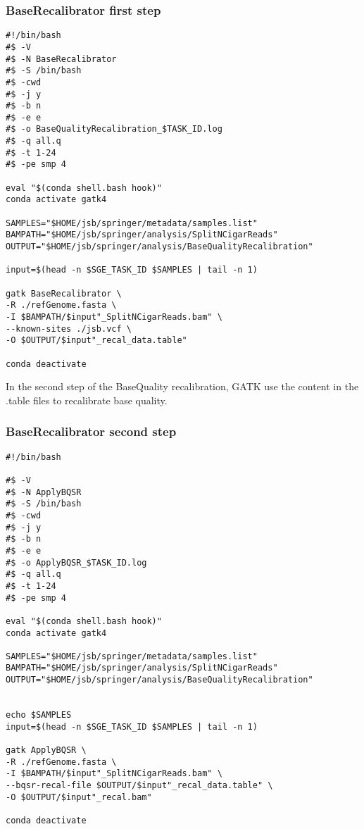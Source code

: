 \subsubsection{BaseRecalibrator first step}
\begin{verbatim}
#!/bin/bash
#$ -V
#$ -N BaseRecalibrator
#$ -S /bin/bash
#$ -cwd
#$ -j y
#$ -b n
#$ -e e
#$ -o BaseQualityRecalibration_$TASK_ID.log
#$ -q all.q
#$ -t 1-24
#$ -pe smp 4

eval "$(conda shell.bash hook)"
conda activate gatk4

SAMPLES="$HOME/jsb/springer/metadata/samples.list"
BAMPATH="$HOME/jsb/springer/analysis/SplitNCigarReads"
OUTPUT="$HOME/jsb/springer/analysis/BaseQualityRecalibration"

input=$(head -n $SGE_TASK_ID $SAMPLES | tail -n 1)

gatk BaseRecalibrator \
-R ./refGenome.fasta \
-I $BAMPATH/$input"_SplitNCigarReads.bam" \
--known-sites ./jsb.vcf \
-O $OUTPUT/$input"_recal_data.table"

conda deactivate
\end{verbatim}


In the second step of the BaseQuality recalibration, GATK use the content in the .table files to recalibrate base quality.


\subsubsection{BaseRecalibrator second step}
\begin{verbatim}
#!/bin/bash

#$ -V
#$ -N ApplyBQSR
#$ -S /bin/bash
#$ -cwd
#$ -j y
#$ -b n
#$ -e e
#$ -o ApplyBQSR_$TASK_ID.log
#$ -q all.q
#$ -t 1-24
#$ -pe smp 4

eval "$(conda shell.bash hook)"
conda activate gatk4

SAMPLES="$HOME/jsb/springer/metadata/samples.list"
BAMPATH="$HOME/jsb/springer/analysis/SplitNCigarReads"
OUTPUT="$HOME/jsb/springer/analysis/BaseQualityRecalibration"


echo $SAMPLES
input=$(head -n $SGE_TASK_ID $SAMPLES | tail -n 1)

gatk ApplyBQSR \
-R ./refGenome.fasta \
-I $BAMPATH/$input"_SplitNCigarReads.bam" \
--bqsr-recal-file $OUTPUT/$input"_recal_data.table" \
-O $OUTPUT/$input"_recal.bam"

conda deactivate
\end{verbatim}






